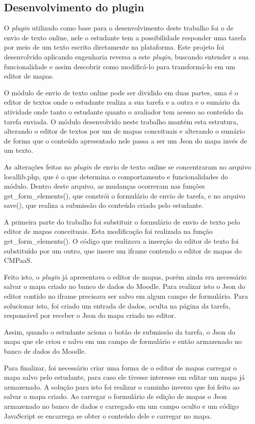 \documentclass[
	12pt,				%
	openright,			%
	oneside,			%
	a4paper,			%
	english,			%
	french,				%
	spanish,			%
	brazil				%
	]{abntex2}
\begin{document}
\subsection{Desenvolvimento do plugin}
O \textit{plugin} utilizado como base para o desenvolvimento deste trabalho foi o de envio de texto online, nele o estudante tem a possibilidade responder uma tarefa por meio de um texto escrito diretamente na plataforma. Este projeto foi desenvolvido aplicando engenharia reversa a este \textit{plugin}, buscando entender a sua funcionalidade e assim descobrir como modificá-lo para transformá-lo em um editor de mapas.

O módulo de envio de texto online pode ser dividido em duas partes, uma é o editor de textos onde o estudante realiza a sua tarefa e a outra e o sumário da atividade onde tanto o estudante quanto o avaliador tem acesso ao conteúdo da tarefa enviada. O módulo desenvolvido neste trabalho mantém esta estrutura, alterando o editor de textos por um de mapas conceituais e alterando o sumário de forma que o conteúdo apresentado nele passa a ser um Json do mapa invés de um texto.

As alterações feitas no \textit{plugin} de envio de texto online se concentraram no arquivo locallib.php, que é o que determina o comportamento e funcionalidades do módulo. Dentro deste arquivo, as mudanças ocorreram nas funções get\_form\_elements(), que constrói o formulário de envio de tarefa, e no arquivo save(), que realiza a submissão do conteúdo criado pelo estudante.

A primeira parte do trabalho foi substituir o formulário de envio de texto pelo editor de mapas conceituais. Esta modificação foi realizada na função get\_form\_elements(). O código que realizava a inserção do editor de texto foi substituído por um outro, que insere um iframe contendo o editor de mapas do CMPaaS. 

Feito isto, o \textit{plugin} já apresentava o editor de mapas, porém ainda era necessário salvar o mapa criado no banco de dados do Moodle. Para realizar isto o Json do editor contido no iframe precisava ser salvo em algum campo de formulário. Para solucionar isto, foi criado um entrada de dados, oculta na página da tarefa, responsável por receber o Json do mapa criado no editor.

Assim, quando o estudante aciona o botão de submissão da tarefa, o Json do mapa que ele criou e salvo em um campo de formulário e então armazenado no banco de dados do Moodle.

Para finalizar, foi necessário criar uma forma de o editor de mapas carregar o mapa salvo pelo estudante, para caso ele tivesse interesse em editar um mapa já armazenado. A solução para isto foi realizar o caminho inverso que foi feito ao salvar o mapa criado. Ao carregar o formulário de edição de mapas o Json armazenado no banco de dados e carregado em um campo oculto e um código JavaScript se encarrega se obter o conteúdo dele e carregar no mapa.
\end{document}
